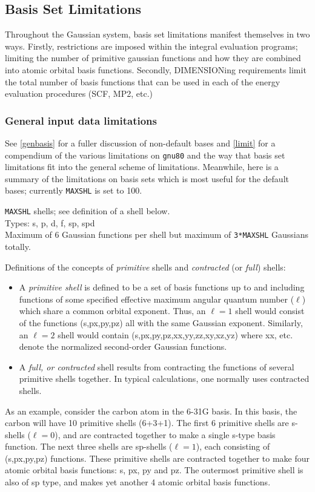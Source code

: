 \subsection{\sf Basis Set Limitations}
\label{basis_lims}
Throughout the Gaussian system, basis set limitations manifest themselves
in two ways.  Firstly, restrictions are imposed within the integral evaluation
programs; limiting the number of primitive gaussian functions and how they
are combined into atomic orbital basis functions.  Secondly, DIMENSIONing
requirements limit the total number of basis functions that can be used
in each of the energy evaluation procedures (SCF, MP2, etc.)

\subsubsection{\sf General input data limitations}
See \ref{genbasis} for a fuller discussion of non-default bases and
\ref{limit} for a compendium of the various limitations
on {\tt gnu80} and the way that basis set limitations fit into the
general scheme of limitations. Meanwhile, here is a summary
of the limitations on basis sets which is most useful for
the default bases; currently {\tt MAXSHL} is set to 100.

{\tt MAXSHL} shells;  see definition of a shell below.\\
Types: s, p, d, f, sp, spd  \\
Maximum of 6 Gaussian functions per shell  
but
maximum of {\tt 3*MAXSHL} Gaussians totally. 

Definitions of the concepts of {\em primitive} shells and {\em contracted} 
(or {\em full}) shells:
\begin{itemize}
\item A {\em primitive shell} is defined to be a set of basis functions up to
and including functions of some specified effective 
maximum angular quantum number ($\ell$) which
share a common orbital exponent.  Thus, an $\ell =1$ shell 
would consist of the
functions (s,px,py,pz) all with the same Gaussian exponent.  Similarly,
an $\ell =2$ shell would contain (s,px,py,pz,xx,yy,zz,xy,xz,yz) where xx,
etc.  denote the normalized second-order Gaussian functions.
\item A {\em full, or contracted} shell results from contracting the functions
of several primitive shells together.  In typical calculations, one
normally uses contracted shells.
\end{itemize}
As an example, consider the carbon atom in the 6-31G basis.  In
this basis, the carbon will have 10 primitive shells (6+3+1). The first
6 primitive shells are s-shells ($\ell =0$), and are contracted together to 
make a single s-type basis function. The next three shells are
sp-shells ($\ell =1$), each consisting of (s,px,py,pz) functions. These
primitive shells are contracted together to make four atomic orbital
basis functions: s, px, py and pz. The outermost primitive shell is
also of sp type, and makes yet another 4 atomic orbital basis
functions.


